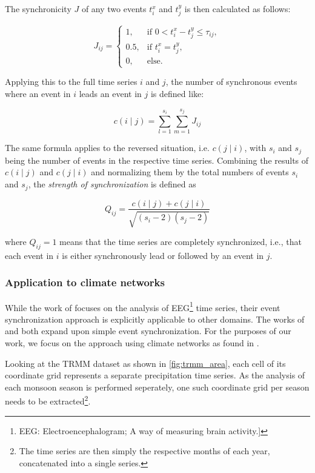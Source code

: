 The synchronicity $J$ of any two events $t_i^x$ and $t_j^y$ is then calculated as follows:

\begin{equation}
  J_{ij} =
  \begin{cases}
    1, & \text{if } 0<t^x_i-t^y_j\leq\tau_{ij}, \\
    0.5, & \text{if } t^x_i=t^y_j, \\
    0, & \text{else.}
  \end{cases}
\end{equation}

Applying this to the full time series $i$ and $j$, the number of synchronous events where an event in $i$ leads an event in $j$ is defined like:

\begin{equation}
  c(i \mid j) = \sum\limits^{s_i}_{l=1} \sum\limits^{s_j}_{m=1} J_{ij}
\end{equation}

The same formula applies to the reversed situation, i.e. $c(j \mid i)$, with $s_i$ and $s_j$ being the number of events in the respective time series. Combining the results of $c(i\mid j)$ and $c(j \mid i)$ and normalizing them by the total numbers of events $s_i$ and $s_j$, the \textit{strength of synchronization} is defined as

\begin{equation} \label{eq:sync_strength}
  Q_{ij} = \frac{c(i \mid j) + c(j \mid i)}{\sqrt{(s_i - 2)(s_j - 2)}}
\end{equation}

where $Q_{ij} = 1$ means that the time series are completely synchronized, i.e., that each event in $i$ is either synchronously lead or followed by an event in $j$.

\subsubsection{Application to climate networks}
\label{ssst:appl_climate_networks}
While the work of \citet{QuianQuiroga.2002} focuses on the analysis of EEG\footnote{EEG: Electroencephalogram; A way of measuring brain activity.]} time series, their event synchronization approach is explicitly applicable to other domains. The works of \citet{Malik.2010} and \citet{Stolbova.2015} both expand upon simple event synchronization. For the purposes of our work, we focus on the approach using climate networks as found in \citet{Stolbova.2015}.

Looking at the TRMM dataset as shown in \cref{fig:trmm_area}, each cell of its coordinate grid represents a separate precipitation time series. As the analysis of each monsoon season is performed seperately, one such coordinate grid per season needs to be extracted\footnote{The time series are then simply the respective months of each year, concatenated into a single series.}.

